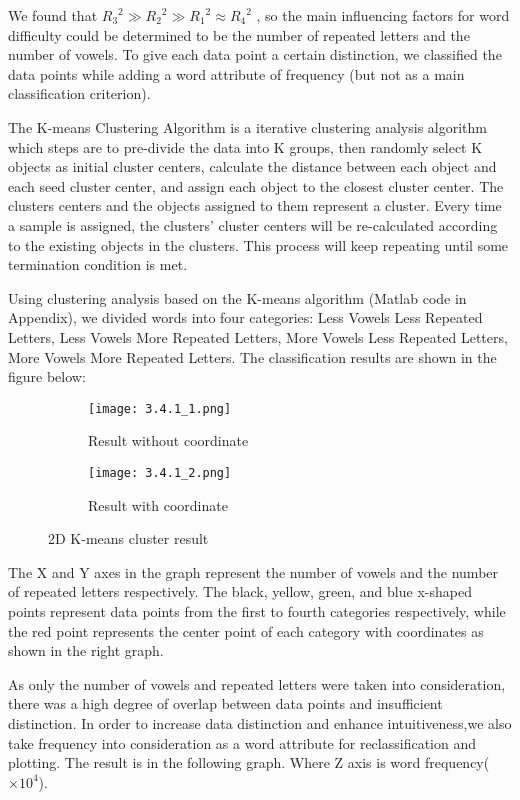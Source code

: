 \documentclass[12pt]{article}  %
\begin{document}
We found that ${R_3} ^{2} \gg{R_2} ^{2} \gg{R_1} ^{2} \approx{R_4} ^{2}$ , so the main influencing factors for word difficulty could be determined to be the number of repeated letters and the number of vowels. To give each data point a certain distinction, we classified the data points while adding a word attribute of frequency (but not as a main classification criterion).


The K-means Clustering Algorithm is a iterative clustering analysis algorithm which steps are to pre-divide the data into K groups, then randomly select K objects as initial cluster centers, calculate the distance between each object and each seed cluster center, and assign each object to the closest cluster center. The clusters centers and the objects assigned to them represent a cluster. Every time a sample is assigned, the clusters' cluster centers will be re-calculated according to the existing objects in the clusters. This process will keep repeating until some termination condition is met.

Using clustering analysis based on the K-means algorithm (Matlab code in Appendix), we divided words into four categories: Less Vowels Less Repeated Letters, Less Vowels More Repeated Letters, More Vowels Less Repeated Letters, More Vowels More Repeated Letters. The classification results are shown in the figure below:

\vspace{0.7cm}
\begin{figure*}[h]
    \centering
        \begin{subfigure}[b]{0.4\textwidth}
            \texttt{[image: 3.4.1\_1.png]}
            \caption{Result without coordinate}
        \end{subfigure}
        \begin{subfigure}[b]{0.4\textwidth}
            \texttt{[image: 3.4.1\_2.png]}
            \caption{Result with coordinate}
        \end{subfigure}
        \caption{2D K-means cluster result}
\end{figure*}

The X and Y axes in the graph represent the number of vowels and the number of repeated letters respectively. The black, yellow, green, and blue x-shaped points represent data points from the first to fourth categories respectively, while the red point represents the center point of each category with coordinates as shown in the right graph.

As only the number of vowels and repeated letters were taken into consideration, there was a high degree of overlap between data points and insufficient distinction. In order to increase data distinction and enhance intuitiveness,we also take frequency   into consideration as a word attribute for reclassification and plotting. The result is in the following graph. Where Z axis is word frequency($\times  10^{4}$).
\end{document}
